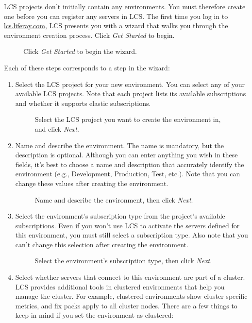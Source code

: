 LCS projects don't initially contain any environments. You must
therefore create one before you can register any servers in LCS. The
first time you log in to
\href{https://lcs.liferay.com}{lcs.liferay.com}, LCS presents you with a
wizard that walks you through the environment creation process. Click
\emph{Get Started} to begin.

\begin{figure}
\centering
{}
\caption{Click \emph{Get Started} to begin the wizard.}
\end{figure}

Each of these steps corresponds to a step in the wizard:

\begin{enumerate}
\def\labelenumi{\arabic{enumi}.}
\item
  Select the LCS project for your new environment. You can select any of
  your available LCS projects. Note that each project lists its
  available subscriptions and whether it supports elastic subscriptions.

  \begin{figure}
  \centering
  \caption{Select the LCS project you want to create the environment in,
  and click \emph{Next}.}
  \end{figure}
\item
  Name and describe the environment. The name is mandatory, but the
  description is optional. Although you can enter anything you wish in
  these fields, it's best to choose a name and description that
  accurately identify the environment (e.g., Development, Production,
  Test, etc.). Note that you can change these values after creating the
  environment.

  \begin{figure}
  \centering
  \caption{Name and describe the environment, then click \emph{Next}.}
  \end{figure}
\item
  Select the environment's subscription type from the project's
  available subscriptions. Even if you won't use LCS to activate the
  servers defined for this environment, you must still select a
  subscription type. Also note that you can't change this selection
  after creating the environment.

  \begin{figure}
  \centering
  \caption{Select the environment's subscription type, then click
  \emph{Next}.}
  \end{figure}
\item
  Select whether servers that connect to this environment are part of a
  cluster. LCS provides additional tools in clustered environments that
  help you manage the cluster. For example, clustered environments show
  cluster-specific metrics, and fix packs apply to all cluster nodes.
  There are a few things to keep in mind if you set the environment as
  clustered:


\end{enumerate}
